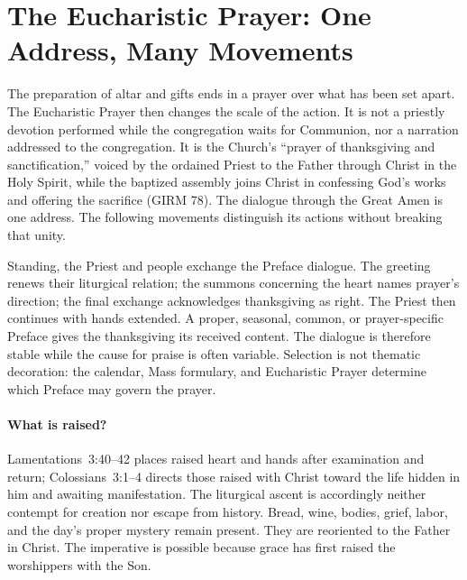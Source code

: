 \section{The Eucharistic Prayer: One Address, Many Movements}

The preparation of altar and gifts ends in a prayer over what has been set apart. The Eucharistic Prayer then changes the scale of the action. It is not a priestly devotion performed while the congregation waits for Communion, nor a narration addressed to the congregation. It is the Church's ``prayer of thanksgiving and sanctification,'' voiced by the ordained Priest to the Father through Christ in the Holy Spirit, while the baptized assembly joins Christ in confessing God's works and offering the sacrifice (GIRM 78). The dialogue through the Great Amen is one address. The following movements distinguish its actions without breaking that unity.


Standing, the Priest and people exchange the Preface dialogue. The greeting renews their liturgical relation; the summons concerning the heart names prayer's direction; the final exchange acknowledges thanksgiving as right. The Priest then continues with hands extended. A proper, seasonal, common, or prayer-specific Preface gives the thanksgiving its received content. The dialogue is therefore stable while the cause for praise is often variable. Selection is not thematic decoration: the calendar, Mass formulary, and Eucharistic Prayer determine which Preface may govern the prayer.

\paragraph{What is raised?}
Lamentations~3:40--42 places raised heart and hands after examination and return; Colossians~3:1--4 directs those raised with Christ toward the life hidden in him and awaiting manifestation. The liturgical ascent is accordingly neither contempt for creation nor escape from history. Bread, wine, bodies, grief, labor, and the day's proper mystery remain present. They are reoriented to the Father in Christ. The imperative is possible because grace has first raised the worshippers with the Son.

